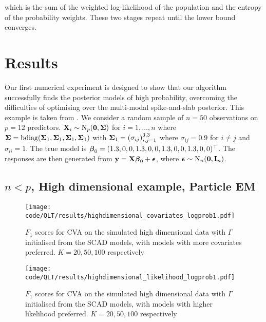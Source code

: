 \documentclass{amsart}[12pt]
\begin{document}
which is the sum of the weighted log-likelihood of the population and the entropy of the probability weights.
These two stages repeat until the lower bound converges.

\section{Results}


Our first numerical experiment is designed to show that our algorithm successfully finds the posterior models
of high probability, overcoming the difficulties of optimising over the multi-modal spike-and-slab posterior.
This example is taken from \citep{Rockova2016}. 
We consider a random sample of $n = 50$ observations on $p = 12$ predictors. ${\bf X}_i \sim \text{N}_p({\bf 0}, {\boldsymbol \Sigma})$
for $i = 1, \ldots, n$ where
${\boldsymbol \Sigma} = \text{bdiag}({\boldsymbol \Sigma}_1, {\boldsymbol \Sigma}_1, {\boldsymbol \Sigma}_1, {\boldsymbol \Sigma}_1)$ with
${\boldsymbol \Sigma}_1 = (\sigma_{ij})_{i, j = 1}^{3, 3}$ where $\sigma_{ij} = 0.9$ for $i \ne j$ and $\sigma_{ii} = 1$.
The true model is ${\boldsymbol \beta}_0 = (1.3, 0, 0, 1.3, 0, 0, 1.3, 0, 0, 1.3, 0, 0)^\top$.
The responses are then generated from ${\bf y} = {\bf X} {\boldsymbol \beta}_0 + {\boldsymbol \epsilon}$, where
${\boldsymbol \epsilon} \sim \text{N}_n({\bf 0}, {\bf I}_n)$.

\subsection{$n < p$, High dimensional example, Particle EM}

\begin{figure}\label{fig:highdim_warm_start_covariates}
\caption{$F_1$ scores for CVA on the simulated high dimensional data with $\Gamma$ initialised from the SCAD models, with models with more covariates preferred. $K=20, 50, 100$ respectively}
\texttt{[image: code/QLT/results/highdimensional\_covariates\_logprob1.pdf]}
\end{figure}

\begin{figure}\label{fig:highdim_warm_start_likelihood}
\caption{$F_1$ scores for CVA on the simulated high dimensional data with $\Gamma$ initialised from the SCAD models, with models with higher likelihood preferred. $K=20, 50, 100$ respectively}
\texttt{[image: code/QLT/results/highdimensional\_likelihood\_logprob1.pdf]}
\end{figure}
\end{document}
